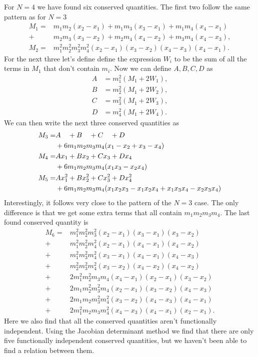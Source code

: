 \documentclass[english,master]{liumaiex}
\theoremstyle{plain}
\theoremstyle{definition}
\begin{document}
For $N = 4$ we have found six conserved quantities. The first two follow the same pattern as for $N = 3$
\begin{align}
	M_1 = &m_1 m_2 (x_2 - x_1) + m_1 m_3 (x_3 - x_1) + m_1 m_4 (x_4 - x_1) \\ +  &m_2 m_3 (x_3 - x_2) + m_2 m_4 (x_4 - x_2) + m_3 m_4 (x_4 - x_3),\\
	M_2 = &m_1^2m_2^2m_3^2m_4^2(x_2 - x_1)(x_3 - x_2)(x_4 - x_3)(x_4 - x_1).
\end{align}
For the next three let's define define the expression $W_i$ to be the sum of all the terms in $M_1$ that don't contain $m_i$. Now we can define $A, B, C, D$ as
\begin{align}
	A &= m_1^2(M_1 + 2W_1), \\
	B &= m_2^2(M_1 + 2W_2), \\
	C &= m_3^2(M_1 + 2W_3), \\
	D &= m_4^2(M_1 + 2W_4).
\end{align}
We can then write the next three conserved quantities as
\begin{align}
	M_3 =& A\phantom{x_1} + B\phantom{x_2} + C\phantom{x_3} + D\phantom{x_4} \notag \\
	&+ 6m_1m_2m_3m_4 (x_1 - x_2 + x_3 - x_4) \\
	M_4 =& Ax_1 + Bx_2 + Cx_3 + Dx_4 \notag \\
	&+ 6m_1m_2m_3m_4 (x_1x_3 - x_2x_4) \\
	M_5 =& Ax_1^2 + Bx_2^2 + Cx_3^2 + Dx_4^2 \notag \\
	&+ 6m_1m_2m_3m_4 (x_1x_2x_3 - x_1x_2x_4 + x_1x_3x_4 - x_2x_3x_4)
\end{align}
%
Interestingly, it follows very close to the pattern of the $N = 3$ case. The only difference is that we get some extra terms that all contain $m_1m_2m_3m_4$. The last found conserved quantity is
\begin{equation}
\begin{aligned}
	M_6 =
		 &m_1^2m_2^2m_3^2(x_2 - x_1)(x_3 - x_1)(x_3 - x_2) \\
		+&m_1^2m_2^2m_4^2(x_2 - x_1)(x_4 - x_1)(x_4 - x_2) \\
		+&m_1^2m_3^2m_4^2(x_3 - x_1)(x_4 - x_1)(x_4 - x_3) \\
		+&m_2^2m_3^2m_4^2(x_3 - x_2)(x_4 - x_2)(x_4 - x_2) \\
		+&2m_1^2m_2^2m_3m_4(x_4 - x_1)(x_2 - x_1)(x_3 - x_2) \\
		+&2m_1m_2^2m_3^2m_4(x_2 - x_1)(x_3 - x_2)(x_4 - x_3) \\
		+&2m_1m_2m_3^2m_4^2(x_3 - x_2)(x_4 - x_3)(x_4 - x_1) \\
		+&2m_1^2m_2m_3m_4^2(x_4 - x_3)(x_4 - x_1)(x_2 - x_1).
\end{aligned}
\end{equation}
Here we also find that all the conserved quantities aren't functionally independent. Using the Jacobian determinant method we find that there are only five functionally independent conserved quantities, but we haven't been able to find a relation between them.
\end{document}

